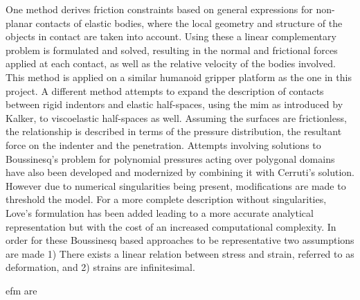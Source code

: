 One method derives friction constraints based on general expressions for non-planar contacts of elastic bodies, where the local geometry and structure of the objects in contact are taken into account. Using these a linear complementary problem is formulated and solved, resulting in the normal and frictional forces applied at each contact, as well as the relative velocity of the bodies involved. This method is applied on a similar humanoid gripper platform as the one in this project\cite*{soft-finger-model-with-adaptive-contact-geometry-for-grasping-and-manipulation-tasks}.
A different method attempts to expand the description of contacts between rigid indentors and elastic half-spaces, using the \gls{mim} as introduced by Kalker\cite*{on-the-contact-problem-in-elastostatics}, to viscoelastic half-spaces as well. Assuming the surfaces are frictionless, the relationship is described in terms of the pressure distribution, the resultant force on the indenter and the penetration\cite*{a-new-algorithm-for-computing-the-indentation-of-a-rigid-body-of-arbitrary-shape-on-a-viscoelastic-half-space}.
Attempts involving solutions to Boussinesq's problem for polynomial pressures acting over polygonal domains\cite*{a-general-approach-to-the-solution-of-boussinesqs-problem-for-polynomial-pressures-acting-over-polygonal-domains} have also been developed and modernized by combining it with Cerruti's solution\cite*{a-boussinesq-cerruti-solution-set-for-constant-and-linear-distribution-of-normal-and-tangential-load-over-a-triangular-area}. However due to numerical singularities being present, modifications are made to threshold the model. For a more complete description without singularities, Love's formulation has been added leading to a more accurate analytical representation but with the cost of an increased computational complexity\cite*{contact-modelling-and-tactile-data-processing-for-robot-skins}. In order for these Boussinesq based approaches to be representative two assumptions are made 1) There exists a linear relation between stress and strain, referred to as deformation, and 2) strains are infinitesimal\cite[Chapter 6]{the-linearized-theory-of-elasticity}.

\gls{efm} are 


